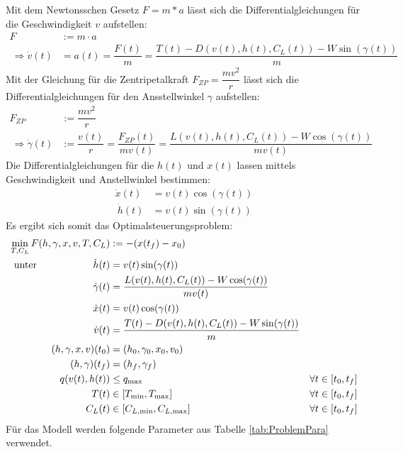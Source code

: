 Mit dem Newtonsschen Gesetz $F = m * a$ lässt sich die Differentialgleichungen für die Geschwindigkeit $v$ aufstellen:
\[\begin{split}
    F &:= m \cdot a \\\
    \Rightarrow \dot{v}(t) &= a(t) = \dfrac{F(t)}{m} = \dfrac{T(t) - D(v(t),h(t),C_L(t)) - W \sin(\gamma(t))}{m}
\end{split} \]
Mit der Gleichung für die Zentripetalkraft $F_{ZP} = \dfrac{m v^2}{r}$ lässt sich die Differentialgleichungen für den Ansstellwinkel $\gamma$ aufstellen:
\[\begin{split}
    F_{ZP} &:= \dfrac{m v^2}{r} \\\
    \Rightarrow \dot{\gamma}(t) &:= \dfrac{v(t)}{r} = \dfrac{F_{ZP}(t)}{m v(t)} = \dfrac{L(v(t),h(t),C_L(t)) - W \cos(\gamma(t))}{m v(t)}
\end{split} \]
Die Differentialgleichungen für die $h(t)$ und $x(t)$ lassen mittels Geschwindigkeit und Anstellwinkel bestimmen:
\[\begin{split}
    \dot{x}(t) &= v(t) \cos(\gamma(t))\\\
    \dot{h}(t) &= v(t) \sin(\gamma(t))
\end{split} \]
Es ergibt sich somit das Optimalsteuerungsproblem:
\begin{align*}
    \min_{T, C_L} F(h,\gamma,x,v,T,C_L) &:= -(x(t_f) - x_0) & & \\\
    \text{unter} \hspace{20mm} \dot{h}(t) &= v(t) \sin(\gamma(t)) \hspace{27mm} & & \\\
    \dot{\gamma}(t) &=  \dfrac{L(v(t),h(t),C_L(t)) - W \cos(\gamma(t))}{mv(t)} & & \\\
    \dot{x}(t) &= v(t) \cos(\gamma(t)) & & \\\
    \dot{v}(t) &= \dfrac{T(t) - D(v(t),h(t),C_L(t)) - W \sin(\gamma(t))}{m} & & \\\
    (h,\gamma,x,v)(t_0) &= (h_0,\gamma_0,x_0,v_0) & & \\\
    (h,\gamma)(t_f) &= (h_f,\gamma_f) & & \\\
    q(v(t),h(t)) &\leq q_{\max} \hspace{19.5mm} & & \forall t \in [t_0,t_f]\\\
    T(t) &\in [T_{\min},T_{\max}] & & \forall t \in [t_0,t_f] \\\
    C_L(t) &\in [C_{L, \min},C_{L, \max}] & & \forall t \in [t_0,t_f]
\end{align*}
Für das Modell werden folgende Parameter aus Tabelle \ref{tab:ProblemPara} verwendet.
